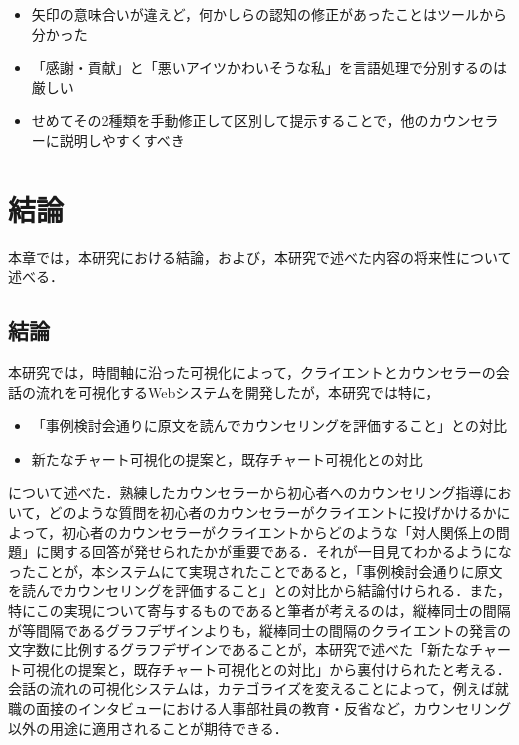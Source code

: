 \documentclass[shuuron]{kuee}
\begin{document}
\begin{itemize}

  \item 矢印の意味合いが違えど，何かしらの認知の修正があったことはツールから分かった
  \item 「感謝・貢献」と「悪いアイツかわいそうな私」を言語処理で分別するのは厳しい

  \item せめてその2種類を手動修正して区別して提示することで，他のカウンセラーに説明しやすくすべき

\end{itemize}
\chapter{結論}

本章では，本研究における結論，および，本研究で述べた内容の将来性について述べる．

\section{結論}

本研究では，時間軸に沿った可視化によって，クライエントとカウンセラーの会話の流れを可視化するWebシステムを開発したが，本研究では特に，
\begin{itemize}
  \item 「事例検討会通りに原文を読んでカウンセリングを評価すること」との対比
  \item 新たなチャート可視化の提案と，既存チャート可視化との対比
\end{itemize}
について述べた．熟練したカウンセラーから初心者へのカウンセリング指導において，どのような質問を初心者のカウンセラーがクライエントに投げかけるかによって，初心者のカウンセラーがクライエントからどのような「対人関係上の問題」に関する回答が発せられたかが重要である．それが一目見てわかるようになったことが，本システムにて実現されたことであると，「事例検討会通りに原文を読んでカウンセリングを評価すること」との対比から結論付けられる．また，特にこの実現について寄与するものであると筆者が考えるのは，縦棒同士の間隔が等間隔であるグラフデザインよりも，縦棒同士の間隔のクライエントの発言の文字数に比例するグラフデザインであることが，本研究で述べた「新たなチャート可視化の提案と，既存チャート可視化との対比」から裏付けられたと考える．会話の流れの可視化システムは，カテゴライズを変えることによって，例えば就職の面接のインタビューにおける人事部社員の教育・反省など，カウンセリング以外の用途に適用されることが期待できる．

\end{document}
